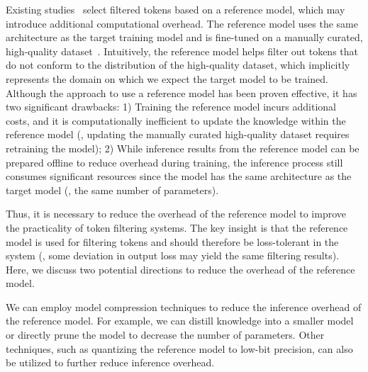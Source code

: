 Existing studies~\cite{RHO} select filtered tokens based on a reference model, which may introduce additional computational overhead. The reference model uses the same architecture as the target training model and is fine-tuned on a manually curated, high-quality dataset~\cite{RHO}. Intuitively, the reference model helps filter out tokens that do not conform to the distribution of the high-quality dataset, which implicitly represents the domain on which we expect the target model to be trained. Although the approach to use a reference model has been proven effective, it has two significant drawbacks: 1) Training the reference model incurs additional costs, and it is computationally inefficient to update the knowledge within the reference model (\eg, updating the manually curated high-quality dataset requires retraining the model); 2) While inference results from the reference model can be prepared offline to reduce overhead during training, the inference process still consumes significant resources since the model has the same architecture as the target model (\ie, the same number of parameters).

Thus, it is necessary to reduce the overhead of the reference model to improve the practicality of token filtering systems. The key insight is that the reference model is used for filtering tokens and should therefore be loss-tolerant in the system (\eg, some deviation in output loss may yield the same filtering results). Here, we discuss two potential directions to reduce the overhead of the reference model.

 We can employ model compression techniques to reduce the inference overhead of the reference model. For example, we can distill knowledge into a smaller model or directly prune the model to decrease the number of parameters. Other techniques, such as quantizing the reference model to low-bit precision, can also be utilized to further reduce inference overhead.

